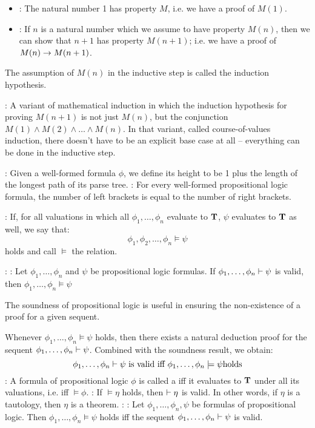     \begin{itemize}
      \item {}: The natural number 1 has property $M$, i.e. we have a proof of $M(1)$.
      \item {}: If $n$ is a natural number which we assume to have property $M(n)$, then we can show that $n + 1$ has property $M(n + 1)$; i.e. we have a proof of $M(n) \rightarrow M(n + 1)$.
    \end{itemize}
    \par The assumption of $M(n)$ in the inductive step is called the induction hypothesis.

    \par {}: A variant of mathematical induction in which the induction hypothesis for proving $M(n + 1)$ is not just $M(n)$, but the conjunction $M(1) \land M(2) \land \ldots \land M(n)$. In that variant, called course-of-values induction, there doesn't have to be an explicit base case at all – everything can be done in the inductive step.

    : Given a well-formed formula $\phi$, we define its height to be
1 plus the length of the longest path of its parse tree.
    : For every well-formed propositional logic formula, the number of left brackets is equal to the number of right brackets.

    : If, for all valuations in which all $\phi_1, \ldots, \phi_n$ evaluate to $\mathbf{T}$, $\psi$ evaluates to $\mathbf{T}$ as well, we say that:
    \[
      \phi_1, \phi_2, \ldots, \phi_n \models \psi
    \]
    holds and call $\models$ the  relation.

    : : Let $\phi_1, \ldots, \phi_n$ and $\psi$ be propositional logic formulas. If $\phi_1, \ldots, \phi_n \vdash \psi$ is valid, then $\phi_1, \ldots, \phi_n \models \psi$

    \par The soundness of propositional logic is useful in ensuring the non-existence of a proof for a given sequent.

    \par Whenever $\phi_1, \ldots, \phi_n \models \psi$ holds, then there exists a natural deduction proof for the sequent $\phi_1, \ldots, \phi_n \vdash \psi$. Combined with the soundness result, we obtain:
    \[
      \phi_1, \ldots, \phi_n \vdash \psi \text{ is valid iff } \phi_1, \ldots, \phi_n \models \psi \text{holds}
    \]
    : A formula of propositional logic $\phi$ is called a  iff it evaluates to $\mathbf{T}$ under all its valuations, i.e. iff $\models \phi$.
    : If $\models \eta$ holds, then $\vdash \eta$ is valid. In other words, if $\eta$ is a tautology, then $\eta$ is a theorem.
    : : Let $\phi_1, \ldots, \phi_n, \psi$ be formulas of propositional logic. Then $\phi_1, \ldots, \phi_n \models \psi$ holds iff the sequent $\phi_1, \ldots, \phi_n \vdash \psi$ is valid.


